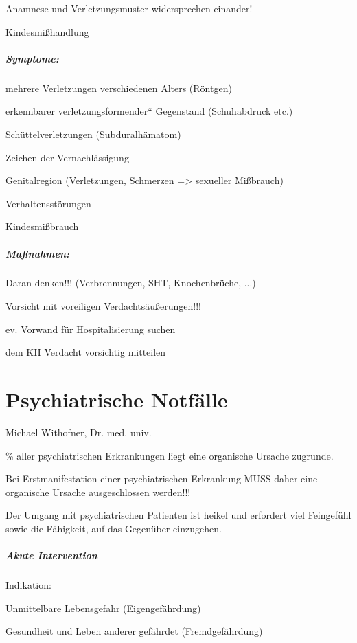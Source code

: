 {\mdseries
Anamnese und Verletzungsmuster  widersprechen einander!}

{\mdseries
Kindesmi{\ss}handlung}

\subparagraph*{
Symptome:}

{\mdseries
mehrere Verletzungen verschiedenen Alters  (Röntgen)}

{\mdseries
erkennbarer {\quotedblbase}verletzungsformender{\textquotedblleft} 
Gegenstand (Schuhabdruck etc.)}

{\mdseries
Sch\"uttelverletzungen (Subduralhämatom)}

{\mdseries
Zeichen der Vernachlässigung}

{\mdseries
Genitalregion (Verletzungen, Schmerzen ={\textgreater}  sexueller
Mi{\ss}brauch)}

{\mdseries
Verhaltensstörungen}

{\mdseries
Kindesmi{\ss}brauch}

\subparagraph*{Ma{\ss}nahmen:}

{\mdseries
Daran denken!!! (Verbrennungen, SHT,  Knochenbr\"uche, ...)}

{\mdseries
Vorsicht mit voreiligen  Verdachtsäu{\ss}erungen!!!}

{\mdseries
ev. Vorwand f\"ur Hospitalisierung suchen}

{\mdseries
dem KH Verdacht vorsichtig mitteilen}

\section{Psychiatrische Notfälle}

Michael Withofner, Dr. med. univ.

\cite{Jolesch2}
{\% aller psychiatrischen Erkrankungen  liegt eine organische Ursache
zugrunde.}

{\mdseries
Bei Erstmanifestation einer  psychiatrischen Erkrankung MUSS  daher eine
organische Ursache  ausgeschlossen werden!!!}

{\mdseries
Der Umgang mit psychiatrischen Patienten ist heikel und erfordert viel
Feingef\"uhl sowie die Fähigkeit, auf das Gegen\"uber einzugehen. }

\subparagraph*{Akute Intervention}

{\mdseries
Indikation:}

{\mdseries
Unmittelbare Lebensgefahr (Eigengefährdung)}

{\mdseries
Gesundheit und Leben anderer gefährdet (Fremdgefährdung)}

